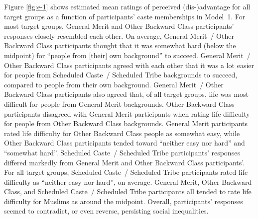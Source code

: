 \documentclass[12pt, a4paper]{article}
\begin{document}
Figure \ref{fig:e-1} shows estimated mean ratings of perceived (dis-)advantage for all target groups as a function of participants' caste memberships in Model~1. For most target groups, General Merit and Other Backward Class participants' responses closely resembled each other. On average, General Merit~/ Other Backward Class participants thought that it was somewhat hard (below the midpoint) for ``people from [their] own background'' to succeed. General Merit~/ Other Backward Class participants agreed with each other that it was a lot easier for people from Scheduled Caste~/ Scheduled Tribe backgrounds to succeed, compared to people from their own background. General Merit~/ Other Backward Class participants also agreed that, of all target groups, life was most difficult for people from General Merit backgrounds. Other Backward Class participants disagreed with General Merit participants when rating life difficulty for people from Other Backward Class backgrounds. General Merit participants rated life difficulty for Other Backward Class people as somewhat easy, while Other Backward Class participants tended toward ``neither easy nor hard'' and ``somewhat hard''. Scheduled Caste~/ Scheduled Tribe participants' responses differed markedly from General Merit and Other Backward Class participants'. For all target groups, Scheduled Caste~/ Scheduled Tribe participants rated life difficulty as ``neither easy nor hard'', on average. General Merit, Other Backward Class, and Scheduled Caste~/ Scheduled Tribe participants all tended to rate life difficulty for Muslims as around the midpoint. Overall, participants' responses seemed to contradict, or even reverse, persisting social inequalities.
\end{document}

